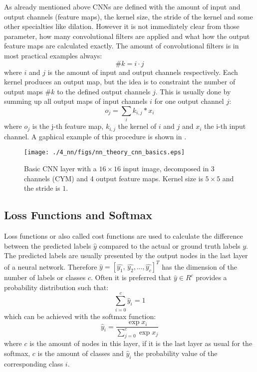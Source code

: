 As already mentioned above CNNs are defined with the amount of input and output channels (feature maps), the kernel size, the stride of the kernel and some other specialties like dilation.
However it is not immediately clear from those parameter, how many convolutional filters are applied and what how the output feature maps are calculated exactly.
The amount of convolutional filters is in most practical examples always:
\begin{equation}\label{eq:nn_theory_n_filters}
  \#k = i \cdot j
\end{equation}
where $i$ and $j$ is the amount of input and output channels respectively.
Each kernel produces an output map, but the idea is to constraint the number of output maps $\#k$ to the defined output channels $j$.
This is usually done by summing up all output maps of input channels $i$ for one output channel $j$:
\begin{equation}
  o_j = \sum_{i} k_{i, j} * x_i
\end{equation}
where $o_j$ is the j-th feature map, $k_{i, j}$ the kernel of $i$ and $j$ and $x_i$ the i-th input channel.
A gaphical example of this procedure is shown in .
\begin{figure}[!ht]
  \centering
    \texttt{[image: ./4\_nn/figs/nn\_theory\_cnn\_basics.eps]}
  \caption{Basic CNN layer with a $16 \times 16$ input image, decomposed in 3 channels (CYM) and 4 output feature maps. Kernel size is $5 \times 5$ and the stride is $1$.}
  \label{fig:nn_theory_cnn_basics}
\end{figure}
\FloatBarrier
\noindent



\subsection{Loss Functions and Softmax}
Loss functions or also called cost functions are used to calculate the difference between the predicted labels $\hat{y}$ compared to the actual or ground truth labels $y$.
The predicted labels are usually presented by the output nodes in the last layer of a neural network.
Therefore $\hat{y} = [\hat{y_1}, \, \hat{y_2}, \dots, \hat{y_c}]^T$ has the dimension of the number of labels or classes $c$.
Often it is preferred that $\hat{y} \in R^c$ provides a probability distribution such that:
\begin{equation}
  \sum_{i=0}^c \hat{y}_i = 1
\end{equation}
which can be achieved with the softmax function:
\begin{equation}\label{eq:nn_theory_softmax}
  \hat{y}_i = \frac{\exp{x_i}}{\sum_{j=0}^{c}\exp{x_j}}
\end{equation}
where $c$ is the amount of nodes in this layer, if it is the last layer as usual for the softmax, $c$ is the amount of classes and $\hat{y}_i$ the probability value of the corresponding class $i$.


